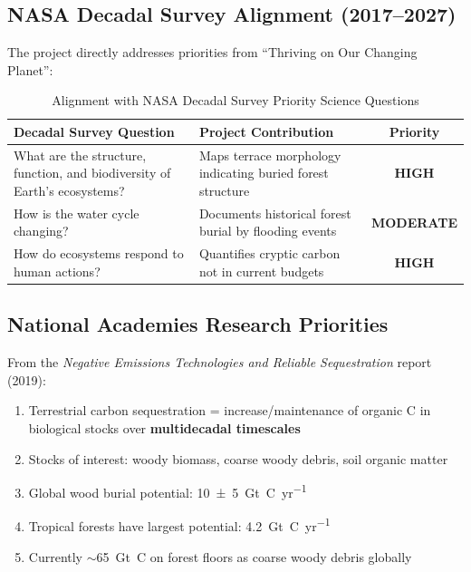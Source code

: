 \documentclass[11pt,letterpaper]{article}
\newcommand{\HIGH}{\textcolor{high}{\textbf{HIGH}}}
\newcommand{\MODERATE}{\textcolor{moderate}{\textbf{MODERATE}}}
\begin{document}
\subsection{NASA Decadal Survey Alignment (2017--2027)}

The project directly addresses priorities from ``Thriving on Our Changing Planet'':

\begin{table}[h]
\centering
\caption{Alignment with NASA Decadal Survey Priority Science Questions}
\label{tab:decadal_alignment}
\begin{tabular}{p{5cm}p{6cm}c}
\toprule
\textbf{Decadal Survey Question} & \textbf{Project Contribution} & \textbf{Priority} \\
\midrule
What are the structure, function, and biodiversity of Earth's ecosystems? & Maps terrace morphology indicating buried forest structure & \HIGH \\
\addlinespace
How is the water cycle changing? & Documents historical forest burial by flooding events & \MODERATE \\
\addlinespace
How do ecosystems respond to human actions? & Quantifies cryptic carbon not in current budgets & \HIGH \\
\bottomrule
\end{tabular}
\end{table}

\subsection{National Academies Research Priorities}

From the \textit{Negative Emissions Technologies and Reliable Sequestration} report (2019):

\begin{enumerate}[noitemsep]
    \item Terrestrial carbon sequestration = increase/maintenance of organic C in biological stocks over \textbf{multidecadal timescales}
    \item Stocks of interest: woody biomass, coarse woody debris, soil organic matter
    \item Global wood burial potential: \SI{10 \pm 5}{Gt~C~yr^{-1}}
    \item Tropical forests have largest potential: \SI{4.2}{Gt~C~yr^{-1}}
    \item Currently $\sim$\SI{65}{Gt~C} on forest floors as coarse woody debris globally
\end{enumerate}
\end{document}
